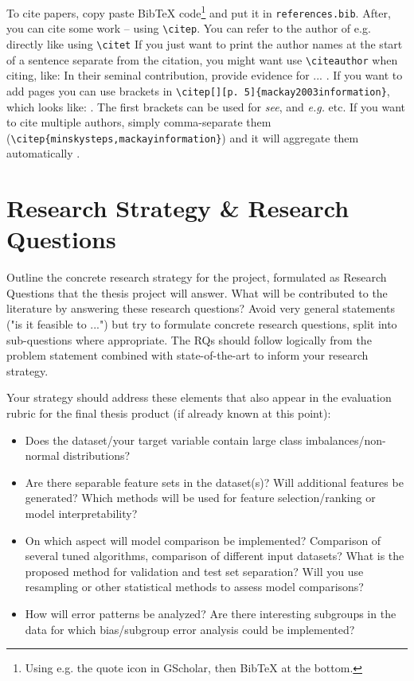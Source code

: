 \documentclass[11pt, a4paper]{article}
\begin{document}
To cite papers, copy paste BibTeX code\footnote{Using e.g. the quote icon in GScholar, then BibTeX at the bottom.} and put it in \texttt{references.bib}. After, you can cite some work \citep{mackay2003information} -- using \texttt{\textbackslash citep}. You can refer to the author of e.g. \citet{minsky1961steps} directly like using \texttt{\textbackslash citet} If you just want to print the author names at the start of a sentence separate from the citation, you might want use \texttt{\textbackslash citeauthor} when citing, like: In their seminal contribution,  \citeauthor{ananny2018seeing} provide evidence for ... \citep{ananny2018seeing}. If you want to add pages you can use brackets in \texttt{\textbackslash citep[][p. 5]\{mackay2003information\}}, which looks like: \citep[][p. 5]{mackay2003information}. The first brackets can be used for \emph{see}, and \emph{e.g.} etc. If you want to cite multiple authors, simply comma-separate them (\texttt{\textbackslash citep\{\-minsky\-steps,\-mackay\-information\}}) and it will aggregate them automatically \citep{minsky1961steps,mackay2003information}.

\section{Research Strategy \& Research Questions}
Outline the concrete research strategy for the project, formulated as Research Questions that the thesis project will answer. What will be contributed to the literature by answering these research questions? Avoid very general statements ("is it feasible to ...") but try to formulate concrete research questions, split into sub-questions where appropriate. The RQs should follow logically from the problem statement combined with state-of-the-art to inform your research strategy.

Your strategy should address these elements that also appear in the evaluation rubric for the final thesis product (if already known at this point):
\begin{itemize}
    \item Does the dataset/your target variable contain large class imbalances/non-normal distributions?
    \item Are there separable feature sets in the dataset(s)? Will additional features be generated? Which methods will be used for feature selection/ranking or model interpretability?
    \item On which aspect will model comparison be implemented? Comparison of several tuned algorithms, comparison of different input datasets? What is the proposed method for validation and test set separation? Will you use resampling or other statistical methods to assess model comparisons?
    \item How will error patterns be analyzed? Are there interesting subgroups in the data for which bias/subgroup error analysis could be implemented?
\end{itemize}
\end{document}
